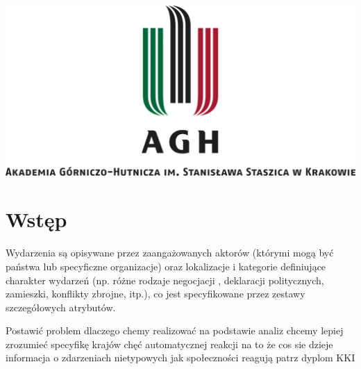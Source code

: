 \documentclass[11pt]{report}
\begin{document}
    \begin{titlepage}
        \centering
        \includegraphics[width=1 \textwidth]{fig/AGH.jpg}
        \vspace{0.03\textheight}
        \bigskip
        \vspace{0.2\textheight}
        \par

        \vspace{0.1\textheight}
    \end{titlepage}

    \tableofcontents


    \chapter{Wstęp}
    Wydarzenia są opisywane przez zaangażowanych aktorów (którymi mogą być państwa lub specyficzne organizacje) oraz lokalizacje i kategorie definiujące charakter wydarzeń (np. różne rodzaje negocjacji , deklaracji politycznych, zamieszki, konflikty zbrojne, itp.), co jest specyfikowane przez zestawy szczegółowych atrybutów.

    Postawić problem
    dlaczego chemy realizować
    na podstawie analiz chcemy lepiej zrozumieć specyfikę krajów
    chęć automatycznej reakcji na to że cos sie dzieje
    informacja o zdarzeniach nietypowych
    jak społeczności reagują
    patrz dyplom KKI
\end{document}
